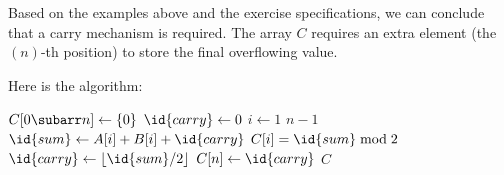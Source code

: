 Based on the examples above and the exercise specifications, we can conclude
that a carry mechanism is required. The array $C$ requires an extra element (the
$(n)$-th position) to store the final overflowing value.

Here is the algorithm:

\begin{codebox}
\li $C[0 \subarr n] \gets \{0\}$
\li $\id{carry} \gets 0$ 
\li \For $i \gets 1$ \To $n - 1$ \Do
\li     $\id{sum} \gets A[i] + B[i] + \id{carry}$
\li     $C[i] = \id{sum} \bmod 2$
\li     $\id{carry} \gets \lfloor \id{sum} / 2 \rfloor$
    \End
\li $C[n] \gets \id{carry}$
\li \Return $C$
\End
\end{codebox}
